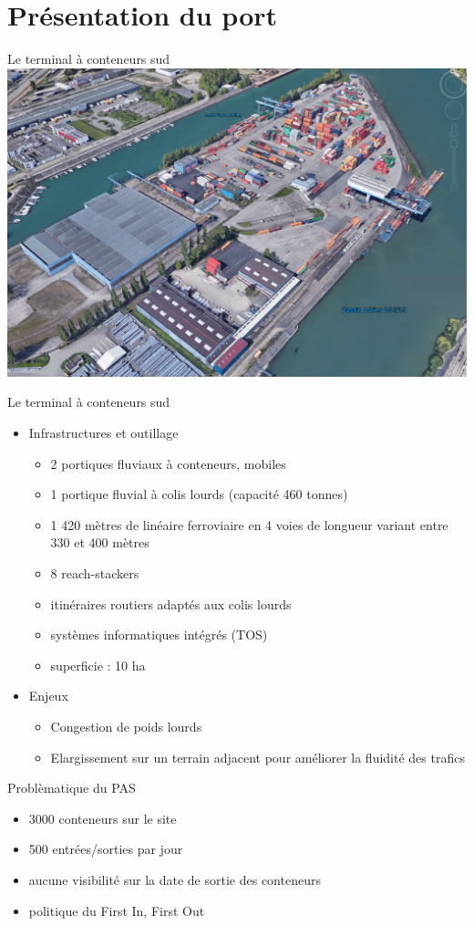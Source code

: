\section{Présentation du port}

\begin{frame}{Le terminal à conteneurs sud}
  \includegraphics[width=\textwidth]{../images/image14}
\end{frame}

\begin{frame}{Le terminal à conteneurs sud}
  \begin{itemize}
  \item Infrastructures et outillage
    \begin{itemize}
    \item
      2 portiques fluviaux à conteneurs, mobiles
    \item
      1 portique fluvial à colis lourds (capacité 460 tonnes)
    \item
      1 420 mètres de linéaire ferroviaire en 4 voies de longueur variant entre 330 et 400 mètres
    \item
      8 reach-stackers
    \item
      itinéraires routiers adaptés aux colis lourds
    \item
      systèmes informatiques intégrés (TOS)
    \item
      superficie : 10 ha
    \end{itemize}
  \item Enjeux
    \begin{itemize}
    \item Congestion de poids lourds
    \item Elargissement sur un terrain adjacent pour améliorer la fluidité des trafics
    \end{itemize}
  \end{itemize}
\end{frame}

\begin{frame}{Problèmatique du PAS}
  \begin{itemize}
  \item 3000 conteneurs sur le site
  \item 500 entrées/sorties par jour
  \item aucune visibilité sur la date de sortie des conteneurs
  \item politique du First In, First Out
  \end{itemize}
\end{frame}
